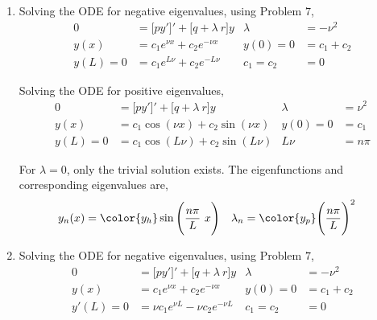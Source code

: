 \begin{enumerate}
    \item Solving the ODE for negative eigenvalues, using Problem $ 7 $,
          \begin{align}
              0         & = \Big[ py' \Big]' + \Big[ q + \lambda\ r \Big] y &
              \lambda   & = -\nu^2                                            \\
              y(x)      & = c_1 e^{\nu x} + c_2 e^{-\nu x}                  &
              y(0)= 0   & = c_1 + c_2                                         \\
              y(L) = 0  & = c_1 e^{L\nu} + c_2e^{-L\nu}                     &
              c_1 = c_2 & = 0
          \end{align}

          Solving the ODE for positive eigenvalues,
          \begin{align}
              0        & = \Big[ py' \Big]' + \Big[ q + \lambda\ r \Big] y &
              \lambda  & = \nu^2                                             \\
              y(x)     & = c_1 \cos(\nu x) + c_2 \sin(\nu x)               &
              y(0)= 0  & = c_1                                               \\
              y(L) = 0 & = c_1 \cos(L\nu) + c_2 \sin(L\nu)                 &
              L\nu     & = n\pi
          \end{align}

          For $ \lambda = 0 $, only the trivial solution exists. The eigenfunctions and
          corresponding eigenvalues are,
          \begin{align}
              y_n(x)    & = \color{y_h} \sin\Bigg( \frac{n\pi}{L}\ x \Bigg) &
              \lambda_n & = \color{y_p} \Bigg( \frac{n\pi}{L} \Bigg)^2
          \end{align}

    \item Solving the ODE for negative eigenvalues, using Problem $ 7 $,
          \begin{align}
              0         & = \Big[ py' \Big]' + \Big[ q + \lambda\ r \Big] y &
              \lambda   & = -\nu^2                                            \\
              y(x)      & = c_1 e^{\nu x} + c_2 e^{-\nu x}                  &
              y(0)= 0   & = c_1 + c_2                                         \\
              y'(L) = 0 & = \nu c_1 e^{\nu L} - \nu c_2 e^{-\nu L}          &
              c_1 = c_2 & = 0
          \end{align}


\end{enumerate}
